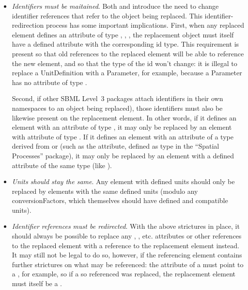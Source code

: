 \begin{itemize}

\item \emph{Identifiers must be maitained}.  Both
  \ReplacedElement and \ReplacedBy introduce the need to change
  identifier references that refer to the object being replaced.  This
  identifier-redirection process has some important implications.
  First, when any replaced element defines an attribute of type 
  , , ,
  the replacement object must itself have a defined attribute with the
  corresponding id type.  This requirement
  is present so that old references to the replaced element will be able
  to reference the new element, and so that the type of the id won't change:
  it is illegal to replace a UnitDefinition with a Parameter, for
  example, because a Parameter has no attribute of type .

  Second, if other SBML Level~3 packages attach identifiers
  in their own namespaces to an object being replaced), those identifiers
  must also be likewise present on the replacement element.  In other words, if
  it defines an element with an attribute of type , it may only
  be replaced by an element with attribute of type .  If it defines
  an element with an attribute of a type derived from  or  (such as the 
   attribute, defined as type  in the
  ``Spatial Processes'' package), it may only be replaced by an element with
  a defined attribute of the same type (like ).


\item \emph{Units should stay the same}.  Any element with defined units
  should only be replaced by elements with the same defined units (modulo
  any conversionFactors, which themselves should have defined and compatible
  units).  

\item \emph{Identifier references must be redirected}.  With the above 
  strictures in place, it should always be possible to replace any 
  , , etc. attributes or other references
  to the replaced element with a reference to the replacement element
  instead.  It may still not be legal to do so, however, if the 
  referencing element contains further strictures on what may be referenced:
  the  attribute of a \Species must point to a 
  \Compartment, for example, so if a \Compartment so referenced
  was replaced, the replacement element must itself be a \Compartment.
  

\end{itemize}
